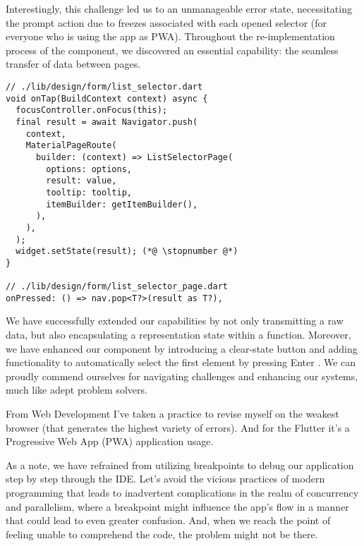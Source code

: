 Interestingly, this challenge led us to an unmanageable error state, necessitating the prompt action due to freezes 
associated with each opened selector (for everyone who is using the app as PWA). Throughout the re-implementation 
process of the component, we discovered an essential capability: the seamless transfer of data between pages.

\begin{lstlisting}
// ./lib/design/form/list_selector.dart
void onTap(BuildContext context) async {
  focusController.onFocus(this);
  final result = await Navigator.push(
    context,
    MaterialPageRoute(
      builder: (context) => ListSelectorPage(
        options: options,
        result: value,
        tooltip: tooltip,
        itemBuilder: getItemBuilder(),
      ),
    ),
  );
  widget.setState(result); (*@ \stopnumber @*)
}

// ./lib/design/form/list_selector_page.dart
onPressed: () => nav.pop<T?>(result as T?),
\end{lstlisting}

\noindent We have successfully extended our capabilities by not only transmitting a raw data, but also encapsulating a 
representation state within a function. Moreover, we have enhanced our component by introducing a clear-state button 
and adding functionality to automatically select the first element by pressing Enter . We can proudly 
commend ourselves for navigating challenges and enhancing our systems, much like adept problem solvers.

From Web Development I've taken a practice to revise myself on the weakest browser (that generates the highest variety
of errors). And for the Flutter it's a Progressive Web App (PWA) application usage.

As a note, we have refrained from utilizing breakpoints to debug our application step by step through the IDE. 
Let's avoid the vicious practices of modern programming that leads to inadvertent complications in the realm of 
concurrency and parallelism, where a breakpoint might influence the app's flow in a manner that could lead to even 
greater confusion. And, when we reach the point of feeling unable to comprehend the code, the problem might not be 
there.
